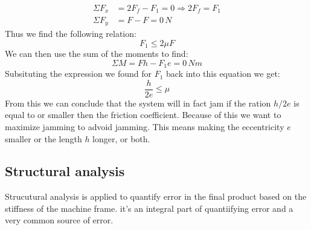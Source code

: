 \documentclass[11pt, a4paper]{article}
\numberwithin{equation}{section}
\numberwithin{figure}{section}
\begin{document}
\begin{align}
  \Sigma F_x &= 2F_f - F_1 = 0 \Rightarrow 2F_f = F_1\\
  \Sigma F_y &= F - F = 0\,N
\end{align}
Thus we find the following relation:
\begin{equation}
  F_1 \leq 2\mu F
\end{equation}
We can then use the sum of the moments to find:
\begin{equation}
  \Sigma M = Fh - F_1 e = 0\,Nm
\end{equation}
Subsituting the expression we found for $F_1$ back into this equation we get:
\begin{equation}
  \frac{h}{2e} \leq \mu
\end{equation}
From this we can conclude that the system will in fact jam if the ration $h/2e$ is equal to or smaller then the friction coefficient. Because of this we want to maximize jamming to advoid jamming. This means making the eccentricity $e$ smaller or the length $h$ longer, or both.


\subsection{Structural analysis}
Strucutural analysis is applied to quantify error in the final product based on the stiffness of the machine frame. it's an integral part of quantiifying error and a very common source of error.
\end{document}

